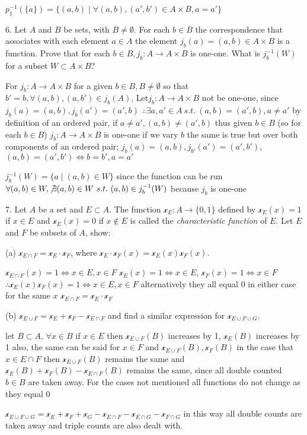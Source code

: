 $p_{1}^{-1}(\{ a\}) = \{(a, b) \mid \forall (a, b), (a', b') \in A \times B, a = a' \}$

6. Let $A$ and $B$ be sets, with $B \not = \emptyset$. For each $b \in B$ the correspondence that associates with each element $a \in A$ the element $j_{b}(a) = (a, b) \in A \times B$ is a function. Prove that for each $b \in B, j_{b}:A \rightarrow A \times B$ is one-one. What is $j_{b}^{-1}(W)$ for a subset $W \subset A \times B$?

For $j_{b}:A \rightarrow A \times B$ for a given $b \in B, B \not = \emptyset$ so that $b' = b, \forall(a, b), (a, b') \in j_{b}(A)$,
Let$j_{b}:A \rightarrow A \times B$ not be one-one, since $j_{b}(a) = (a, b), j_{b}(a') = (a', b)$ $\therefore \exists a , a' \in A\ s.t.\ (a, b) = (a', b), a \not = a'$ 
by definition of an ordered pair, if $a \not = a', (a, b) \not = (a', b)$
thus given $b \in B$ (so for each $b \in B$) $j_{b}:A \rightarrow A \times B$ is one-one
if we vary $b$ the same is true but over both components of an ordered pair; $j_{b}(a) = (a, b), j_{b'}(a') = (a', b')$, $(a, b) = (a', b') \iff b = b', a = a'$

$j_{b}^{-1}(W) = \{ a \mid (a, b) \in W\}$ since the function can be run $\forall (a, b) \in W, \not \exists (a, b) \in W\ s.t.\ (a,b) \in j_{b}^{-1}(W)$ because $j_{b}$ is one-one

7. Let $A$ be a set and $E \subset A$. The function $\mathscr{x}_{E}: A \rightarrow \{ 0, 1\}$ defined by $\mathscr{x}_{E}(x) = 1$ if $x \in E$ and $\mathscr{x}_{E}(x) = 0$ if $x \not \in E$ is called the \textit{characteristic function} of $E$. Let $E$ and $F$ be subsets of $A$, show:

(a) $\mathscr{x}_{E \cap F} = \mathscr{x}_{E}\cdot \mathscr{x}_{F}$, where $\mathscr{x}_{E} \cdot \mathscr{x}_{F}(x) = \mathscr{x}_{E}(x) \mathscr{x}_F(x)$. 

$\mathscr{x}_{E\cap F}(x) = 1 \iff  x \in E, x \in F$
$\mathscr{x}_{E}(x) = 1 \iff x \in E$, $\mathscr{x}_{F}(x) = 1 \iff x \in F$
$\therefore \mathscr{x}_{E}(x) \mathscr{x}_F(x) = 1 \iff x \in E, x \in F$
alternatively they all equal $0$ in either case for the same $x$ $\mathscr{x}_{E \cap F} = \mathscr{x}_{E}\cdot \mathscr{x}_{F}$

(b) $\mathscr{x}_{E \cup F} = \mathscr{x}_{E} + \mathscr{x}_{F} - \mathscr{x}_{E \cap F}$ and find a similar expression for $\mathscr{x}_{E \cup F \cup G}$.

let $B \subset A$, 
$\forall x \in B$ if $x \in E$ then $\mathscr{x}_{E \cup F}(B) $ increases by 1, $\mathscr{x}_{E}(B)$ increases by 1 also, the same can be said for $x \in F$ and $\mathscr{x}_{E \cup F}(B) , \mathscr{x}_{F}(B)$
in the case that $x \in E \cap F$ then $\mathscr{x}_{E \cup F}(B)$ remains the same and $\mathscr{x}_{E}(B) + \mathscr{x}_{F}(B) - \mathscr{x}_{E \cap F}(B)$ remains the same, since all double counted $b \in B$ are taken away.
For the cases not mentioned all functions do not change as they equal $0$

$\mathscr{x}_{E \cup F \cup G} = \mathscr{x}_{E} + \mathscr{x}_{F} +  \mathscr{x}_{G} - \mathscr{x}_{E \cap F} - \mathscr{x}_{E \cap G} - \mathscr{x}_{F \cap G}$ in this way all double counts are taken away and triple counts are also dealt with.
